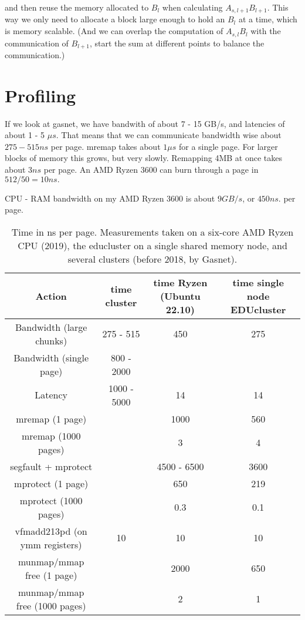 \documentclass{article}
\begin{document}
and then reuse the memory allocated to $B_l$ when calculating $A_{s, l + 1} B_{l + 1}$. This way we only need to allocate a block large enough to hold an $B_l$ at a time, which is memory scalable. (And we can overlap the computation of $A_{s, l} B_l$ with the communication of $B_{l + 1}$, start the sum at different points to balance the communication.) 

\section{Profiling}

If we look at gasnet, we have bandwith of about 7 - 15 GB/s, and latencies of about 1 - 5 $\mu s$. That means
that we can communicate bandwidth wise about $275 - 515 ns$ per page. 
mremap takes about $1 \mu s$ for a single page. For larger blocks of memory this grows, but very slowly. 
Remapping 4MB at once takes about $3 ns$ per page. An AMD Ryzen 3600 can burn through a page in $512 / 50 = 10ns.$

CPU - RAM bandwidth on my AMD Ryzen 3600 is about $9GB/s$, or $450 ns.$ per page. 

\begin{table}[ht]
    \centering
    \begin{tabular}{c|c|c|c}
    Action & time cluster & time Ryzen (Ubuntu 22.10) & time single node EDUcluster \\
    \hline
    Bandwidth (large chunks) & 275 - 515 & 450 & 275 \\
    Bandwidth (single page) & 800 - 2000 & &  \\
    Latency & 1000 - 5000 & 14 & 14 \\
    mremap (1 page) & & 1000 & 560 \\
    mremap (1000 pages) & & 3 & 4 \\
    segfault + mprotect & & 4500 - 6500 & 3600 \\
    mprotect (1 page) & & 650 & 219 \\
    mprotect (1000 pages) & & 0.3 & 0.1 \\
    vfmadd213pd (on ymm registers) & 10 & 10 & 10\\
    munmap/mmap free (1 page) & & 2000 & 650 \\
    munmap/mmap free (1000 pages) & & 2 & 1    
    \end{tabular}
    \caption{Time in ns per page. Measurements taken on a six-core AMD Ryzen CPU (2019),
    the educluster on a single shared memory node, 
    and several clusters (before 2018, by Gasnet).}
    \label{tab:my_label}
\end{table}
\end{document}
